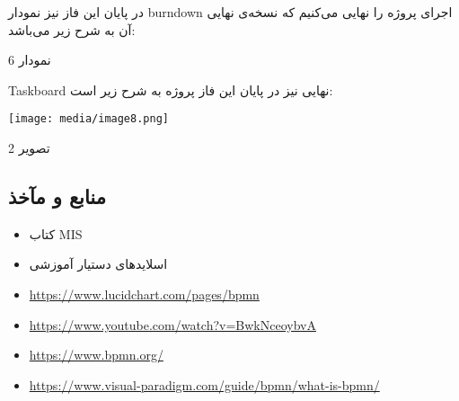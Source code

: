 \documentclass[]{article}
\begin{document}
در پایان این فاز نیز نمودار burndown اجرای پروژه را نهایی می‌کنیم که
نسخه‌ی نهایی آن به شرح زیر می‌باشد:

نمودار 6

Taskboard نهایی نیز در پایان این فاز پروژه به شرح زیر است:

\texttt{[image: media/image8.png]}

تصویر 2

\subsection{منابع و
مآخذ}\label{ux645ux646ux627ux628ux639-ux648-ux645ux622ux62eux630}

\begin{itemize}
\item
  کتاب MIS
\item
  اسلایدهای دستیار آموزشی
\end{itemize}

\begin{itemize}
\item
  \url{https://www.lucidchart.com/pages/bpmn}
\item
  \url{https://www.youtube.com/watch?v=BwkNceoybvA}
\item
  \url{https://www.bpmn.org/}
\item
  \url{https://www.visual-paradigm.com/guide/bpmn/what-is-bpmn/}
\end{itemize}
\end{document}

